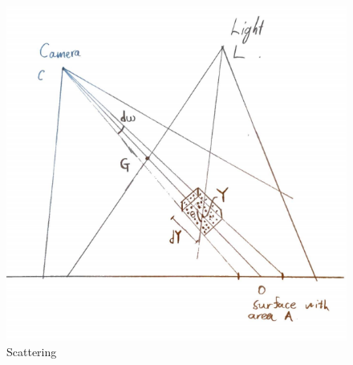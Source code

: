 \documentclass{article}
\begin{document}
\begin{figure}
    \centering
    \includegraphics[width=\textwidth]{B.png}
    \caption{Scattering}
    \label{fig:scatter_B}
\end{figure}



\end{document}
